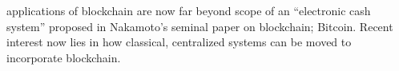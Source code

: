 \documentclass[10pt,journal,compsoc]{IEEEtran}
\begin{document}

\maketitle


\IEEEdisplaynontitleabstractindextext
%
\IEEEpeerreviewmaketitle


 applications of blockchain are now far beyond scope of an “electronic cash system” proposed in Nakamoto's\cite{Nakamoto2008} seminal paper on blockchain; Bitcoin. Recent interest now lies in how classical, centralized systems can be moved to incorporate blockchain.
\end{document}

